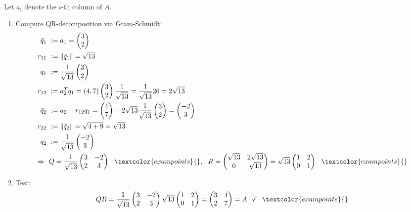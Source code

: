 Let $a_i$ denote the $i$-th column of $A$.
\begin{enumerate}
	\item 
	Compute QR-decomposition via Gram-Schmidt:
	\begin{align*}
	\tilde{q}_1~&:=a_1 =\begin{pmatrix}3\\2\end{pmatrix}\\
	r_{11}~&:=\|\tilde{q}_1\|=\sqrt{13}\\
	q_1~&:=\frac{1}{\sqrt{13}}\begin{pmatrix}3\\2\end{pmatrix}\\
	r_{12}~&:=a_2^Tq_1 = (4,7)\begin{pmatrix}3\\2\end{pmatrix}\frac{1}{\sqrt{13}}=\frac{1}{\sqrt{13}}26=2\sqrt{13}\\
	\tilde{q}_2~&:=a_2-r_{12}q_1=\begin{pmatrix}4\\7\end{pmatrix}-2\sqrt{13}\frac{1}{\sqrt{13}}\begin{pmatrix}3\\2\end{pmatrix}=\begin{pmatrix}-2\\3\end{pmatrix}\\
	r_{22}~&:=\|\tilde{q}_2\|=\sqrt{4+9}=\sqrt{13}\\
	q_2~&:=\frac{1}{\sqrt{13}}\begin{pmatrix}-2\\3\end{pmatrix}\\
	\Rightarrow~~&
	Q=\frac{1}{\sqrt{13}}\begin{pmatrix}3&-2\\2&3\end{pmatrix}~~\textcolor{exampoints}{},~~
	R=\begin{pmatrix}\sqrt{13}&2\sqrt{13}\\0&\sqrt{13}\end{pmatrix}=\sqrt{13}\begin{pmatrix}1&2\\0&1\end{pmatrix}~~\textcolor{exampoints}{}
	\end{align*}
	\item Test:$$QR=\frac{1}{\sqrt{13}}\begin{pmatrix}3&-2\\2&3\end{pmatrix}\sqrt{13}\begin{pmatrix}1&2\\0&1\end{pmatrix}=\begin{pmatrix}3&4\\2&7\end{pmatrix}=A~~\checkmark~~\textcolor{exampoints}{}$$
\end{enumerate}